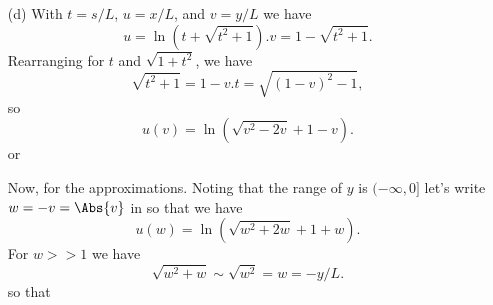 {\begin{enumerate}
With \(t = s/L\), we have a plot of \(u(t) = x(Lt)/L\), and the small and large limit approximations above in \cref{fig:modernOpticsProblemSet1:modernOpticsProblemSet1Fig2c}.
%
%
\item[(d)]
With \(t = s/L\), \(u = x/L\), and \(v = y/L\) we have
%
\begin{subequations}
\begin{equation}\label{eqn:modernOpticsProblemSet1P2:410}
u = \ln\left( t + \sqrt{t^2 + 1} \right).
\end{equation}
\begin{equation}\label{eqn:modernOpticsProblemSet1P2:430}
v = 1 - \sqrt{t^2 + 1}.
\end{equation}
\end{subequations}
%
Rearranging for \(t\) and \(\sqrt{1 + t^2}\), we have
%
\begin{subequations}
\begin{equation}\label{eqn:modernOpticsProblemSet1P2:450}
\sqrt{t^2 + 1} = 1 - v.
\end{equation}
\begin{equation}\label{eqn:modernOpticsProblemSet1P2:470}
t = \sqrt{(1 - v)^2 - 1},
\end{equation}
\end{subequations}
%
so
%
\begin{equation}\label{eqn:modernOpticsProblemSet1P2:490}
u(v) = \ln\left( \sqrt{v^2 - 2 v} + 1 - v \right).
\end{equation}
%
or

Now, for the approximations.  Noting that the range of \(y\) is \((-\infty, 0]\) let's write \(w = -v = \Abs{v}\) in  so that we have
%
\begin{equation}\label{eqn:modernOpticsProblemSet1P2:490b}
u(w) = \ln\left( \sqrt{w^2 + 2 w} + 1 + w \right).
\end{equation}
%
For \(w >> 1\) we have
%
\begin{equation}\label{eqn:modernOpticsProblemSet1P2:610}
\sqrt{w^2 + w} \sim \sqrt{w^2} = w = -y/L.
\end{equation}
%
so that


\end{enumerate}}
